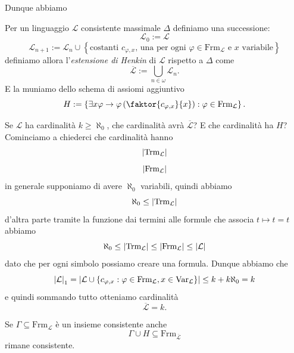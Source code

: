 \documentclass[11pt]{scrartcl}
\begin{document}
 	Dunque abbiamo
 	\begin{definition}
 		Per un linguaggio $\mathcal{L}$ consistente massimale $\Delta$ definiamo una successione:
 		$$\mathcal{L}_0:=\mathcal{L}$$
 		$$\mathcal{L}_{n+1}:=\mathcal{L}_{n}\cup\left\{\text{costanti $c_{\varphi,x}$, una per ogni $\varphi\in \text{Frm}_\mathcal{L}$ e $x$ variabile}\right\}$$
 		definiamo allora l'\textit{estensione di Henkin} di $\mathcal{L}$ rispetto a $\Delta$ come
 		$$\overline{\mathcal{L}}:=\bigcup_{n\in\omega}\mathcal{L}_n.$$
 		E la muniamo dello schema di assiomi aggiuntivo
 		$$H:=\left\{\exists x\varphi \to \varphi\left(\faktor{c_{\varphi,x}}{x}\right):\varphi\in \text{Frm}_\mathcal{L}\right\}.$$
 	\end{definition}
 	Se $\mathcal{L}$ ha cardinalità $k\ge \aleph_0$, che cardinalità avrà $\overline{\mathcal{L}}$? E che cardinalità ha $H$? Cominciamo a chiederci che cardinalità hanno
 	$$\left\lvert \text{Trm}_\mathcal{L} \right\rvert$$
 	$$\left\lvert \text{Frm}_\mathcal{L} \right\rvert$$
 	in generale supponiamo di avere $\aleph_0$ variabili, quindi abbiamo
 	$$\aleph_0\le \left\lvert \text{Trm}_\mathcal{L} \right\rvert$$
 	d'altra parte tramite la funzione dai termini alle formule che associa $t\mapsto t=t$ abbiamo
 	$$\aleph_0\le \left\lvert \text{Trm}_\mathcal{L} \right\rvert\le \left\lvert \text{Frm}_\mathcal{L} \right\rvert\le \left\lvert \mathcal{L} \right\rvert$$
 	dato che per ogni simbolo possiamo creare una formula. Dunque abbiamo che 
 	$$\left\lvert \mathcal{L} \right\rvert_1=\left\lvert \mathcal{L}\cup \left\{c_{\varphi,x}:\varphi\in \text{Frm}_{\mathcal{L}},x\in \text{Var}_\mathcal{L}\right\} \right\rvert\le k+k\aleph_0=k$$
 	e quindi sommando tutto otteniamo cardinalità
 	$$\overline{\mathcal{L}}=k.$$
 	\begin{lemma}
 		Se $\Gamma\subseteq \text{Frm}_\mathcal{L}$ è un insieme consistente anche 
 		$$\Gamma\cup H\subseteq \text{Frm}_{\overline{\mathcal{L}}}$$
 		rimane consistente.
 	\end{lemma}
\end{document}
